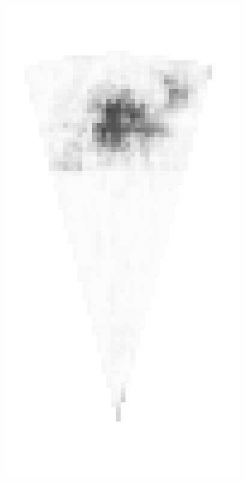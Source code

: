 \begin{figure}[!t]
{        \includegraphics[height=0.2\textheight]{chapters/images/proposals/unseen/rotating-platform-wrench-heatmap.jpg}
}
\end{figure}
